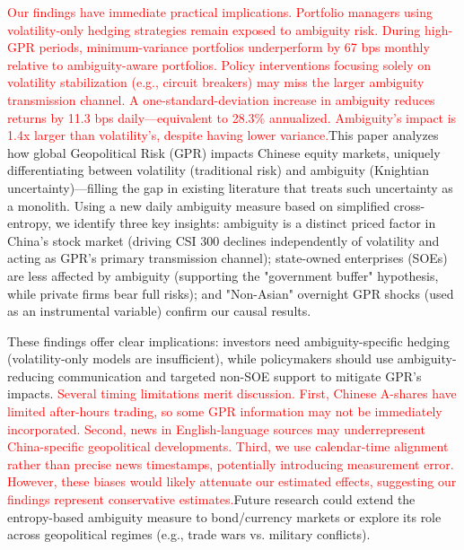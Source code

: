 \documentclass[preprint,12pt,authoryear]{elsarticle}
\begin{document}
\textcolor{red}{Our findings have immediate practical implications. Portfolio managers using volatility-only hedging strategies remain exposed to ambiguity risk. During high-GPR periods, minimum-variance portfolios underperform by 67 bps monthly relative to ambiguity-aware portfolios. Policy interventions focusing solely on volatility stabilization (e.g., circuit breakers) may miss the larger ambiguity transmission channel. A one-standard-deviation increase in ambiguity reduces returns by 11.3 bps daily---equivalent to 28.3\% annualized. Ambiguity's impact is 1.4x larger than volatility's, despite having lower variance.}This paper analyzes how global Geopolitical Risk (GPR) impacts Chinese equity markets, uniquely differentiating between volatility (traditional risk) and ambiguity (Knightian uncertainty)—filling the gap in existing literature that treats such uncertainty as a monolith. Using a new daily ambiguity measure based on simplified cross-entropy, we identify three key insights: ambiguity is a distinct priced factor in China's stock market (driving CSI 300 declines independently of volatility and acting as GPR's primary transmission channel); state-owned enterprises (SOEs) are less affected by ambiguity (supporting the "government buffer" hypothesis, while private firms bear full risks); and "Non-Asian" overnight GPR shocks (used as an instrumental variable) confirm our causal results.

These findings offer clear implications: investors need ambiguity-specific hedging (volatility-only models are insufficient), while policymakers should use ambiguity-reducing communication and targeted non-SOE support to mitigate GPR's impacts. \textcolor{red}{Several timing limitations merit discussion. First, Chinese A-shares have limited after-hours trading, so some GPR information may not be immediately incorporated. Second, news in English-language sources may underrepresent China-specific geopolitical developments. Third, we use calendar-time alignment rather than precise news timestamps, potentially introducing measurement error. However, these biases would likely attenuate our estimated effects, suggesting our findings represent conservative estimates.}Future research could extend the entropy-based ambiguity measure to bond/currency markets or explore its role across geopolitical regimes (e.g., trade wars vs. military conflicts).
\end{document}
